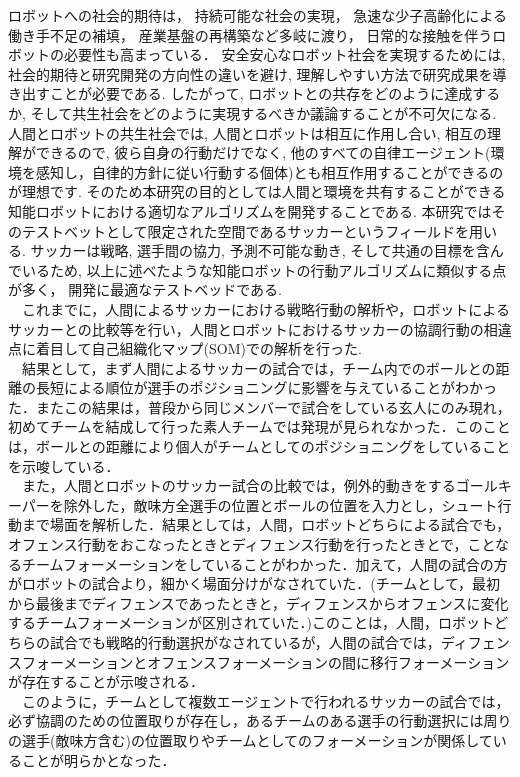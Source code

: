   ロボットへの社会的期待は， 持続可能な社会の実現， 急速な少子高齢化による働き手不足の補填， 産業基盤の再構築など多岐に渡り， 日常的な接触を伴うロボットの必要性も高まっている． 安全安心なロボット社会を実現するためには, 社会的期待と研究開発の方向性の違いを避け, 理解しやすい方法で研究成果を導き出すことが必要である.  したがって, ロボットとの共存をどのように達成するか, そして共生社会をどのように実現するべきか議論することが不可欠になる. 人間とロボットの共生社会では, 人間とロボットは相互に作用し合い, 相互の理解ができるので, 彼ら自身の行動だけでなく, 他のすべての自律エージェント(環境を感知し，自律的方針に従い行動する個体)とも相互作用することができるのが理想です. そのため本研究の目的としては人間と環境を共有することができる知能ロボットにおける適切なアルゴリズムを開発することである. 本研究ではそのテストベットとして限定された空間であるサッカーというフィールドを用いる. サッカーは戦略, 選手間の協力, 予測不可能な動き, そして共通の目標を含んでいるため, 以上に述べたような知能ロボットの行動アルゴリズムに類似する点が多く， 開発に最適なテストベッドである. 
  \\　これまでに，人間によるサッカーにおける戦略行動の解析や，ロボットによるサッカーとの比較等を行い，人間とロボットにおけるサッカーの協調行動の相違点に着目して自己組織化マップ(SOM)での解析を行った.\cite{Moeko}
\\　結果として，まず人間によるサッカーの試合では，チーム内でのボールとの距離の長短による順位が選手のポジショニングに影響を与えていることがわかった．またこの結果は，普段から同じメンバーで試合をしている玄人にのみ現れ，初めてチームを結成して行った素人チームでは発現が見られなかった．このことは，ボールとの距離により個人がチームとしてのポジショニングをしていることを示唆している．
\\　また，人間とロボットのサッカー試合の比較では，例外的動きをするゴールキーパーを除外した，敵味方全選手の位置とボールの位置を入力とし，シュート行動まで場面を解析した．結果としては，人間，ロボットどちらによる試合でも，オフェンス行動をおこなったときとディフェンス行動を行ったときとで，ことなるチームフォーメーションをしていることがわかった．加えて，人間の試合の方がロボットの試合より，細かく場面分けがなされていた．(チームとして，最初から最後までディフェンスであったときと，ディフェンスからオフェンスに変化するチームフォーメーションが区別されていた．)このことは，人間，ロボットどちらの試合でも戦略的行動選択がなされているが，人間の試合では，ディフェンスフォーメーションとオフェンスフォーメーションの間に移行フォーメーションが存在することが示唆される．
\\　このように，チームとして複数エージェントで行われるサッカーの試合では，必ず協調のための位置取りが存在し，あるチームのある選手の行動選択には周りの選手(敵味方含む)の位置取りやチームとしてのフォーメーションが関係していることが明らかとなった．
